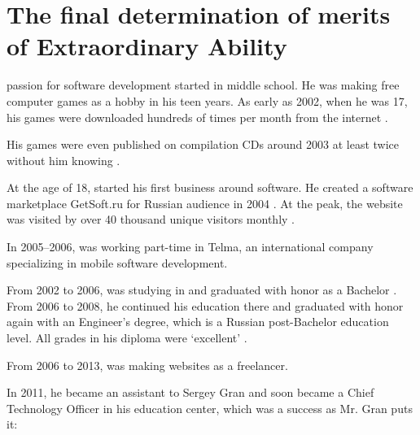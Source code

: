 \section{The final determination of merits of \mrls Extraordinary Ability}
\label{sec:Merits}

\mrls passion for software development started in middle school.
He was making free computer games as a hobby in his teen years.
As early as 2002, when he was 17, his games were downloaded hundreds of times per month from the internet
.

His games were even published on compilation CDs around 2003 at least twice
without him knowing .

At the age of 18, \mrl started his first business around software.
He created a software marketplace GetSoft.ru for Russian audience in 2004 .
At the peak, the website was visited by over 40 thousand unique visitors monthly .

In 2005--2006, \mrl was working part-time in Telma, an international company
specializing in mobile software development.

From 2002 to 2006, \mrl was studying in \Nntu and graduated with honor as a Bachelor .
From 2006 to 2008, he continued his education there and graduated with honor again
with an Engineer's degree, which is a Russian post-Bachelor education level.
All grades in his diploma were `excellent' .

From 2006 to 2013, \mrl was making websites as a freelancer.

In 2011, he became an assistant to Sergey Gran and soon became a Chief Technology Officer
in his education center, which was a success as Mr. Gran puts it:


